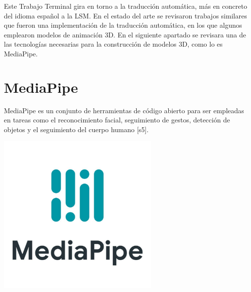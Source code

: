 Este Trabajo Terminal gira en torno a la traducción automática, más en concreto del idioma español a la LSM. En el estado del arte se revisaron trabajos similares que fueron una implementación de la traducción automática, en los que algunos emplearon modelos de animación 3D. En el siguiente apartado se revisara una de las tecnologías necesarias para la construcción de modelos 3D, como lo es MediaPipe.\\

\section{MediaPipe}
MediaPipe es un conjunto de herramientas de código abierto para ser empleadas en tareas como el reconocimiento facial, seguimiento de gestos, detección de objetos y el seguimiento del cuerpo humano [s5].

\begin{center}
    \includegraphics[width=0.6\textwidth]{Images/Cap 2/MediaPipeLogo.jpeg}
\end{center}



